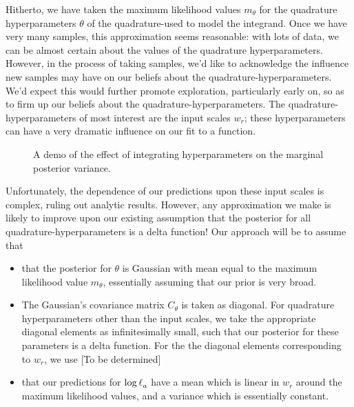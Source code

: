 \documentclass{article}
\begin{document}
Hitherto, we have taken the maximum likelihood values $m_\theta$ for the quadrature hyperparameters $\theta$ of the quadrature-\gpb used to model the integrand. Once we have very many samples, this approximation seems reasonable: with lots of data, we can be almost certain about the values of the quadrature hyperparameters. However, in the process of taking samples, we'd like to acknowledge the influence new samples may have on our beliefs about the quadrature-hyperparameters. We'd expect this would further promote exploration, particularly early on, so as to firm up our beliefs about the quadrature-hyperparameters. The quadrature-hyperparameters of most interest are the input scales $w_r$; these hyperparameters can have a very dramatic influence on our fit to a function.

\begin{figure}
\centering
\caption{A demo of the effect of integrating hyperparameters on the marginal posterior variance.}
\label{fig:integrate_hypers}
\end{figure}

Unfortunately, the dependence of our predictions upon these input scales is complex, ruling out analytic results. However, any approximation we make is likely to improve upon our existing assumption that the posterior for all quadrature-hyperparameters is a delta function! Our approach will be to assume that
\begin{itemize}
 \item that the posterior for $\theta$ is Gaussian with mean equal to the maximum likelihood value $m_\theta$, essentially assuming that our prior is very broad. 
\item The Gaussian's covariance matrix $C_\theta$ is taken as diagonal. For quadrature hyperparameters other than the input scales, we take the appropriate diagonal elements as infinitesimally small, such that our posterior for these parameters is a delta function. For the the diagonal elements corresponding to $w_r$, we use [To be determined]
\item that our predictions for $\tr_a$ have a mean which is linear in $w_r$ around the maximum likelihood values, and a variance which is essentially constant.  
\end{itemize}
 
\end{document}
